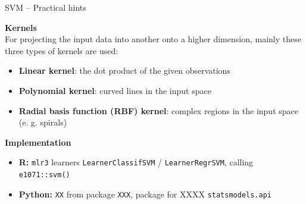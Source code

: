 \documentclass[11pt,compress,t,notes=noshow, xcolor=table]{beamer}
\newcommand{\highlight}[1]{\textcolor{highlightcol}{\textbf{#1}}}
\let\code=\texttt
\begin{document}

\begin{frame}{SVM -- Practical hints}

\footnotesize

  \highlight{Kernels} \\
  \smallskip
 For projecting the input data into another onto a higher dimension, mainly these three types of kernels are used: 
 \begin{itemize}
 
 \item \textbf{Linear kernel}: the dot product of the given observations
 
 \item \textbf{Polynomial kernel}: curved lines in the input space
 
 \item \textbf{Radial basis function (RBF) kernel}: complex regions in the input space (e. g. spirals)
 
 \end{itemize}
 
 

\medskip

  \highlight{Implementation} 
  \begin{itemize}
    \item \textbf{R:} \code{mlr3} learners \code{LearnerClassifSVM} / 
    \code{LearnerRegrSVM}, calling \code{e1071::svm()}
    \item \textbf{Python:} \code{XX} from package \code{XXX}, package for XXXX 
    \code{statsmodels.api}
  \end{itemize}

\end{frame}

\end{document}
